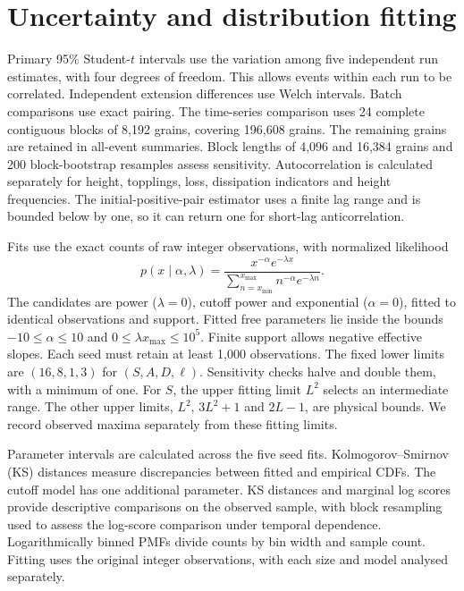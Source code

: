 \section{Uncertainty and distribution fitting}\label{sec:statistics}
Primary 95\% Student-$t$ intervals use the variation among five independent run estimates, with four degrees of freedom. This allows events within each run to be correlated. Independent extension differences use Welch intervals. Batch comparisons use exact pairing. The time-series comparison uses 24 complete contiguous blocks of 8,192 grains, covering 196,608 grains. The remaining grains are retained in all-event summaries. Block lengths of 4,096 and 16,384 grains and 200 block-bootstrap resamples assess sensitivity. Autocorrelation is calculated separately for height, topplings, loss, dissipation indicators and height frequencies. The initial-positive-pair estimator uses a finite lag range and is bounded below by one, so it can return one for short-lag anticorrelation.

Fits use the exact counts of raw integer observations, with normalized likelihood
\begin{equation}
 p(x\mid\alpha,\lambda)=\frac{x^{-\alpha}e^{-\lambda x}}
 {\sum_{n=x_{\min}}^{x_{\max}}n^{-\alpha}e^{-\lambda n}}.
 \label{eq:fit}
\end{equation}
The candidates are power ($\lambda=0$), cutoff power and exponential ($\alpha=0$), fitted to identical observations and support. Fitted free parameters lie inside the bounds $-10\leq\alpha\leq10$ and $0\leq\lambda x_{\max}\leq10^5$. Finite support allows negative effective slopes. Each seed must retain at least 1,000 observations. The fixed lower limits are $(16,8,1,3)$ for $(S,A,D,\ell)$. Sensitivity checks halve and double them, with a minimum of one. For $S$, the upper fitting limit $L^2$ selects an intermediate range. The other upper limits, $L^2$, $3L^2+1$ and $2L-1$, are physical bounds. We record observed maxima separately from these fitting limits.

Parameter intervals are calculated across the five seed fits. Kolmogorov--Smirnov (KS) distances measure discrepancies between fitted and empirical CDFs. The cutoff model has one additional parameter. KS distances and marginal log scores provide descriptive comparisons on the observed sample, with block resampling used to assess the log-score comparison under temporal dependence. Logarithmically binned PMFs divide counts by bin width and sample count. Fitting uses the original integer observations, with each size and model analysed separately.
